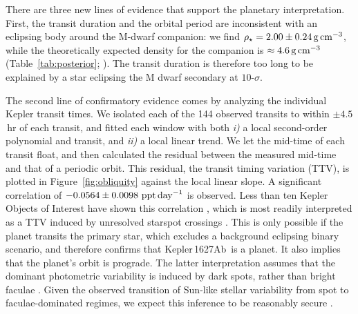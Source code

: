 \documentclass[12pt,modern,twocolumn,tighten]{aastex63}
\newcommand{\pn}{Kepler\,1627Ab} %
\begin{document}
There are three new lines of evidence that support the planetary
interpretation.  First, the transit duration and the orbital period
are inconsistent with an eclipsing body around the M-dwarf companion:
we find $\rho_\star = 2.00 \pm 0.24\,{\rm g\,cm}^{-3}$, while the
theoretically expected density for the companion is
$\approx 4.6\,{\rm g\,cm}^{-3}$ (Table~\ref{tab:posterior};
\citealt{choi_mesa_2016}).  The transit duration is therefore too long
to be explained by a star eclipsing the M dwarf secondary at
$10$-$\sigma$.


The second line of confirmatory evidence comes by analyzing the
individual Kepler transit times. We isolated each of the
144 observed transits to within $\pm4.5$\,hr of each transit, and
fitted each window with both {\it i)} a local second-order polynomial
and transit, and {\it ii)} a local linear trend.  We let the mid-time
of each transit float, and then calculated the residual between the
measured mid-time and that of a periodic orbit.  This
residual, the transit timing variation (TTV), is plotted in
Figure~\ref{fig:obliquity} against the local linear slope.  A
significant correlation of $-0.0564 \pm 0.0098\ {\rm ppt\,day}^{-1}$
is observed.  Less than ten Kepler Objects of Interest have shown this
correlation \citep{holczer_time_2015}, which is most readily
interpreted as a TTV induced by unresolved starspot crossings
\citep{mazeh_time_2015}.  This is only possible if the planet transits
the primary star, which excludes a background eclipsing binary
scenario, and therefore confirms that \pn\ is a planet.  It also
implies that the planet's orbit is prograde.  The latter
interpretation assumes that the dominant photometric variability is
induced by dark spots, rather than bright faculae
\citep{mazeh_time_2015}.  Given the observed transition of Sun-like
stellar variability from spot to faculae-dominated regimes, we expect
this inference to be reasonably secure
\citep{shapiro_are_2016,montet_long-term_2017,reinhold_stellar_2020}.
\end{document}
